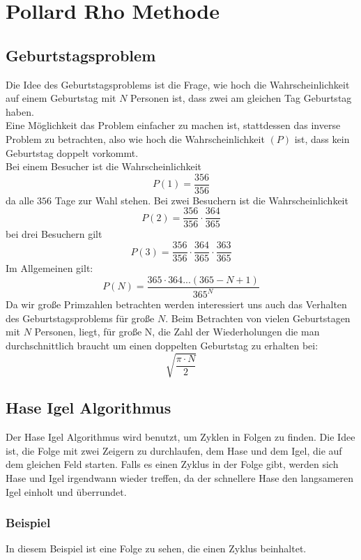  
  
  \section{Pollard Rho Methode}
  \label{sec:pollard}
  \subsection{Geburtstagsproblem}
  Die Idee des Geburtstagsproblems ist die Frage, wie hoch die Wahrscheinlichkeit auf einem Geburtstag mit $N$ Personen ist, dass zwei am gleichen Tag Geburtstag haben.\\
  Eine M\"oglichkeit das Problem einfacher zu machen ist, stattdessen das inverse Problem zu betrachten, also wie hoch die Wahrscheinlichkeit $(P)$ ist, dass kein Geburtstag doppelt vorkommt.\\
  Bei einem Besucher ist die Wahrscheinlichkeit $$P(1)=\frac{356}{356}$$ da alle $356$ Tage zur Wahl stehen. Bei zwei Besuchern ist die Wahrscheinlichkeit $$P(2)=\frac{356}{356}\cdot \frac{364}{365}$$ bei drei Besuchern gilt  $$P(3)=\frac{356}{356}\cdot \frac{364}{365} \cdot \frac{363}{365}$$
  Im Allgemeinen gilt: $$P(N)= \frac{365 \cdot 364 ... (365-N+1)}{365^N}$$
  Da wir gro\ss e Primzahlen betrachten werden interessiert uns auch das Verhalten des Geburtstagsproblems f\"ur gro\ss e $N$.
  Beim Betrachten von vielen Geburtstagen mit $N$ Personen, liegt, f\"ur gro\ss e N, die Zahl der Wiederholungen die man durchschnittlich braucht um einen doppelten Geburtstag zu erhalten bei: $$\sqrt{\frac{\pi \cdot N}{2}}$$ 
  
  \subsection{Hase Igel Algorithmus}
  Der Hase Igel Algorithmus wird benutzt, um Zyklen in Folgen zu finden. Die Idee ist, die Folge mit zwei Zeigern zu durchlaufen, dem Hase und dem Igel, die auf dem gleichen Feld starten. Falls es einen Zyklus in der Folge gibt, werden sich Hase und Igel irgendwann wieder treffen, da der schnellere Hase den langsameren Igel einholt und \"uberrundet.
  \subsubsection{Beispiel}
  In diesem Beispiel ist eine Folge zu sehen, die einen Zyklus beinhaltet. 
  
